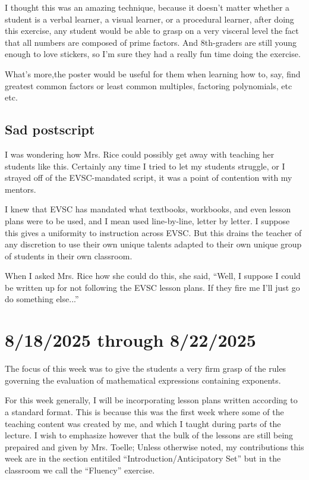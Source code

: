 \documentclass[11pt]{elegantbook}
\begin{document}
I thought this was an amazing technique, because it doesn't matter
whether a student is a verbal learner, a visual learner, or a
procedural learner, after doing this exercise, any student would be
able to grasp on a very visceral level the fact that all numbers are
composed of prime factors.  And 8th-graders are still young enough to
love stickers, so I'm sure they had a really fun time doing the
exercise.

What's more,the poster would be useful for them when learning how to,
say, find greatest common factors or least common multiples, factoring
polynomials, etc etc.

\section*{Sad postscript}

I was wondering how Mrs. Rice could possibly get away with teaching
her students like this.  Certainly any time I tried to let my students
struggle, or I strayed off of the EVSC-mandated script, it was a point
of contention with my mentors.

I knew that EVSC has mandated what textbooks, workbooks, and even
lesson plans were to be used, and I mean used line-by-line, letter by
letter.  I suppose this gives a uniformity to instruction across
EVSC. But this drains the teacher of any discretion to use their own
unique talents adapted to their own unique group of students in their
own classroom.

When I asked Mrs. Rice how she could do this, she said, ``Well, I
suppose I could be written up for not following the EVSC lesson plans.
If they fire me I'll just go do something else...''


\chapter{8/18/2025 through 8/22/2025}

The focus of this week was to give the students a very firm grasp of
the rules governing the evaluation of mathematical expressions
containing exponents.

For this week generally, I will be incorporating lesson plans written
according to a standard format.  This is because this was the first
week where some of the teaching content was created by me, and which I
taught during parts of the lecture.  I wish to emphasize however that
the bulk of the lessons are still being prepaired and given by
Mrs. Toelle; Unless otherwise noted, my contributions this week are in
the section entitiled ``Introduction/Anticipatory Set'' but in the
classroom we call the ``Fluency'' exercise.
\end{document}
